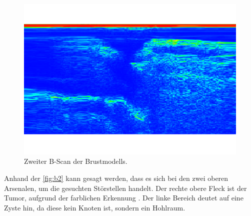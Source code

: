 \begin{figure}[H]
    \centering
	\includegraphics[width=0.8\linewidth]{content/grafik/Super_Tumor.pdf}
    \captionsetup{width=0.765\linewidth}
	\caption{Zweiter B-Scan der Brustmodells.}
	\label{fig:b2}
\end{figure}

Anhand der \autoref{fig:b2} kann gesagt werden, dass es sich bei den zwei oberen Arsenalen, um die gesuchten
Störstellen handelt. Der rechte obere Fleck ist der Tumor, aufgrund der farblichen Erkennung . Der linke Bereich deutet auf eine 
Zyste hin, da diese kein Knoten ist, sondern ein Hohlraum.